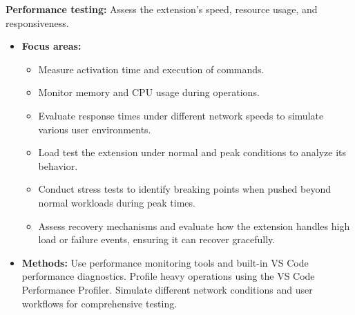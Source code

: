 \textbf{Performance testing:} Assess the extension’s speed, resource usage, and responsiveness.
\begin{itemize}
    \item \textbf{Focus areas:}
        \begin{itemize}
            \item Measure activation time and execution of commands.
            \item Monitor memory and CPU usage during operations.
            \item Evaluate response times under different network speeds to simulate various user environments.
            \item Load test the extension under normal and peak conditions to analyze its behavior.
            \item Conduct stress tests to identify breaking points when pushed beyond normal workloads during peak times.
            \item Assess recovery mechanisms and evaluate how the extension handles high load or failure events, ensuring it can recover gracefully.
        \end{itemize}
    \item \textbf{Methods:} Use performance monitoring tools and built-in VS Code performance diagnostics. Profile heavy operations using the VS Code Performance Profiler. Simulate different network conditions and user workflows for comprehensive testing.
\end{itemize}